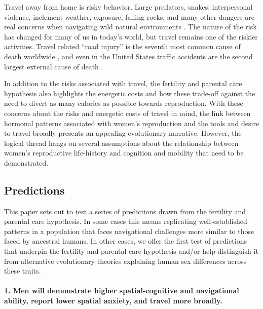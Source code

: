 Travel away from home is risky behavior.  Large predators, snakes, interpersonal violence, inclement weather, exposure, falling rocks, and many other dangers are real concerns when navigating wild natural environments \citep{treves1999risk, pugh1980incidence, walker2001bioarchaeological}.  The nature of the risk has changed for many of us in today's world, but travel remains one of the riskier activities.  Travel related ``road injury'' is the seventh most common cause of death worldwide \citep{krug2000global}, and even in the United States traffic accidents are the second largest external cause of death \citep{sherry2010cdc}.  

In addition to the risks associated with travel, the fertility and parental care hypothesis also highlights the energetic costs and how these trade-off against the need to divert as many calories as possible towards reproduction.  With these concerns about the risks and energetic costs of travel in mind, the link between hormonal patterns associated with women's reproduction and the tools and desire to travel broadly presents an appealing evolutionary narrative.  However, the logical thread hangs on several assumptions about the relationship between women's reproductive life-history and cognition and mobility that need to be demonstrated.

	\subsection{Predictions}
	\label{sec:1.2}
This paper sets out to test a series of predictions drawn from the fertility and parental care hypothesis.  In some cases this means replicating well-established patterns in a population that faces navigational challenges more similar to those faced by ancestral humans.  In other cases, we offer the first test of predictions that underpin the fertility and parental care hypothesis and/or help distinguish it from alternative evolutionary theories explaining human sex differences across these traits.	
	
\paragraph{1. Men will demonstrate higher spatial-cognitive and navigational ability, report lower spatial anxiety, and travel more broadly.}\mbox{}\\

